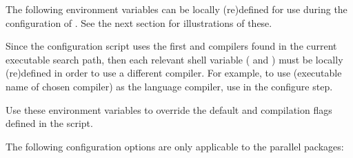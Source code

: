 
\vspace{0.25in}
\noindent The following environment variables can be locally (re)defined for use during the configuration of {\sundials}. See the next section for illustrations of these.

\begin{config}

\item {}

\item {}

  Since the configuration script uses the first {\C} and {\F} compilers found in
  the current executable search path, then each relevant shell variable (
  and ) must be locally (re)defined in order to use a different compiler. 
  For example, to use  (executable name of chosen compiler) as the {\C}
  language compiler, use  in the configure step.

\item {}

\item {}

  Use these environment variables to override the default {\C} and {\F}
  compilation flags defined in the  script.

\end{config}


\vspace{0.25in}
\noindent The following configuration options are only applicable to the parallel {\sundials} packages:

